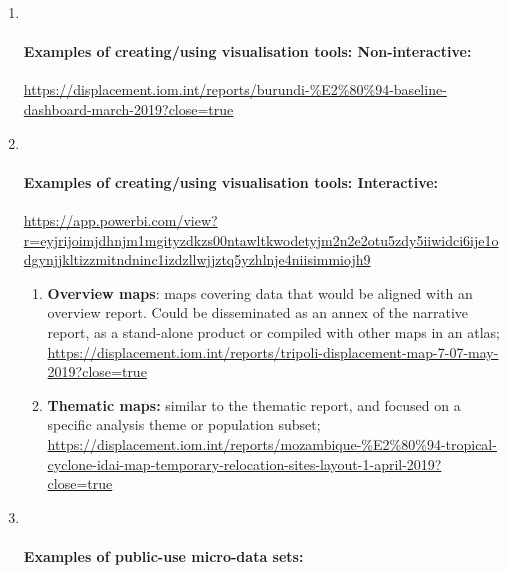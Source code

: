 \documentclass[
]{article}
\begin{document}
\begin{enumerate}
\def\labelenumi{\arabic{enumi})}
\setcounter{enumi}{8}
\item ~
  \hypertarget{examples-of-creatingusing-visualisation-tools-non-interactive}{%
  \paragraph{Examples of creating/using visualisation tools: Non-interactive:}\label{examples-of-creatingusing-visualisation-tools-non-interactive}}

  \url{https://displacement.iom.int/reports/burundi-\%E2\%80\%94-baseline-dashboard-march-2019?close=true}
\item ~
  \hypertarget{examples-of-creatingusing-visualisation-tools-interactive}{%
  \paragraph{Examples of creating/using visualisation tools: Interactive:}\label{examples-of-creatingusing-visualisation-tools-interactive}}

  \url{https://app.powerbi.com/view?r=eyjrijoimjdhnjm1mgityzdkzs00ntawltkwodetyjm2n2e2otu5zdy5iiwidci6ije1odgynjjkltizzmitndninc1izdzllwjjztq5yzhlnje4niisimmiojh9}

  \begin{enumerate}
  \def\labelenumii{\arabic{enumii}.}
  \setcounter{enumii}{10}
  \item
    \textbf{Overview maps}: maps covering data that would be aligned with
    an overview report. Could be disseminated as an annex of the
    narrative report, as a stand-alone product or compiled with
    other maps in an atlas;
    \url{https://displacement.iom.int/reports/tripoli-displacement-map-7-07-may-2019?close=true}
  \item
    \textbf{Thematic maps:} similar to the thematic report, and focused
    on a specific analysis theme or population subset;
    \url{https://displacement.iom.int/reports/mozambique-\%E2\%80\%94-tropical-cyclone-idai-map-temporary-relocation-sites-layout-1-april-2019?close=true}
  \end{enumerate}
\item ~
  \hypertarget{examples-of-public-use-micro-data-sets}{%
  \paragraph{Examples of public-use micro-data sets:}\label{examples-of-public-use-micro-data-sets}}
\end{enumerate}
\end{document}
